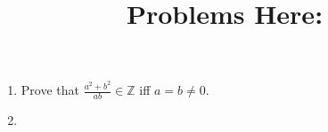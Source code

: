 \documentclass[12 pt]{article}
\begin{document}
\title{Problems Here:}
\date{}
\maketitle

\newpage

\begin{enumerate}
    \item Prove that $\frac{a^2+b^2}{ab} \in \mathbb{Z}$ iff $a=b \not = 0$.
    \item 
\end{enumerate}
\end{document}
